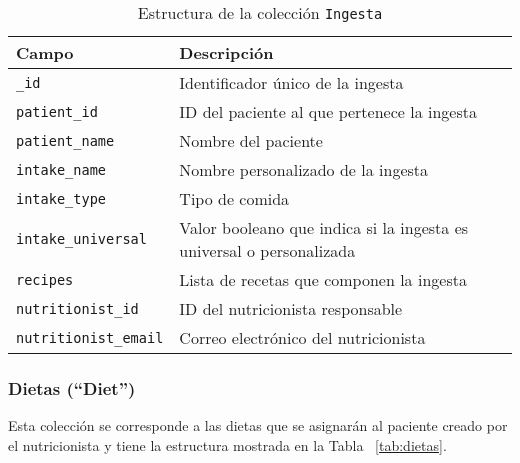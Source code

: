\begin{table}[h]
    \centering
    \begin{tabular}{|l|p{8cm}|}
        \hline
        \textbf{Campo} & \textbf{Descripción} \\
        \hline
        \texttt{\_id} & Identificador único de la ingesta \\
        \hline
        \texttt{patient\_id} & ID del paciente al que pertenece la ingesta \\
        \hline
        \texttt{patient\_name} & Nombre del paciente \\
        \hline
        \texttt{intake\_name} & Nombre personalizado de la ingesta \\
        \hline
        \texttt{intake\_type} & Tipo de comida \\
        \hline
        \texttt{intake\_universal} & Valor booleano que indica si la ingesta es universal o personalizada \\
        \hline
        \texttt{recipes} & Lista de recetas que componen la ingesta \\
        \hline
        \texttt{nutritionist\_id} & ID del nutricionista responsable \\
        \hline
        \texttt{nutritionist\_email} & Correo electrónico del nutricionista \\
        \hline
    \end{tabular}
    \caption{Estructura de la colección \texttt{Ingesta}}
    \label{tab:ingesta}
\end{table}


\subsubsection{Dietas (``Diet'')}
Esta colección se corresponde a las dietas que se asignarán al paciente creado por el nutricionista y tiene la estructura mostrada en la Tabla ~\ref{tab:dietas}.

